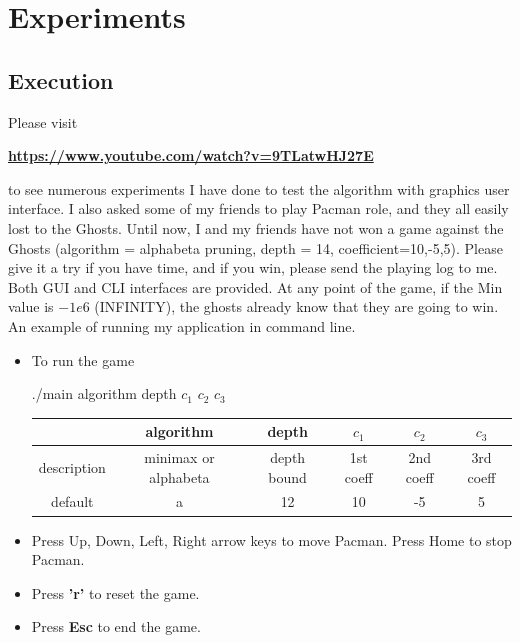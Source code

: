 \documentclass[a4paper, 11pt]{article}
\begin{document}
\section{Experiments}
\subsection{Execution} 
Please visit 
\begin{center}\textbf{\url{https://www.youtube.com/watch?v=9TLatwHJ27E}} \end{center}
to see numerous experiments I have done to test the algorithm with graphics user interface. I also asked some of my friends to play Pacman role, and they all easily lost to the Ghosts. Until now, I and my friends have not won a game against the Ghosts (algorithm = alphabeta pruning, depth = 14, coefficient=10,-5,5). Please give it a try if you have time, and if you win, please send the playing log to me. \\
Both GUI and CLI interfaces are provided. At any point of the game, if the Min value is $-1e6$ (INFINITY), the ghosts already know that they are going to win.
An example of running my application in command line. 
\begin{itemize}
\item To run the game
\begin{center} ./main algorithm depth $c_1$ $c_2$ $c_3$ \end{center}
\begin{table}[ht]
  \centering
  \begin{tabular}{|c|c|c|c|c|c|}
    \hline
    & algorithm & depth & $c_1$ & $c_2$ & $c_3$ \\ \hline
    description & minimax or alphabeta & depth bound&1st coeff & 2nd coeff &3rd coeff \\ \hline
    default & a & 12 & 10 & -5 & 5 \\
    \hline
  \end{tabular}
\end{table}
\item Press Up, Down, Left, Right arrow keys to move Pacman. Press Home to stop Pacman.
\item Press \textbf{'r'} to reset the game. 
\item Press \textbf{Esc} to end the game.

\end{itemize}
\end{document}
